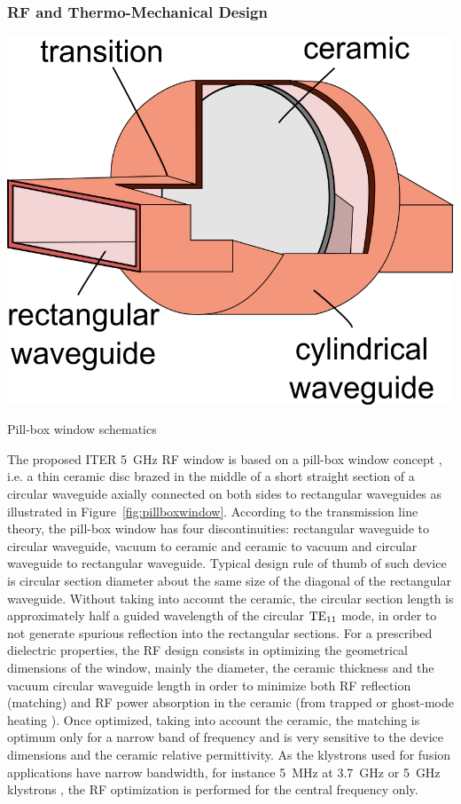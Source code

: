 {%
\subsubsection{RF and Thermo-Mechanical Design}
\begin{marginfigure}
	\centering
	\includegraphics[width=1.0\linewidth]{figures/chap3/pillbox_window}
	\caption{Pill-box window schematics}
	\label{fig:pillboxwindow}
\end{marginfigure}

The proposed ITER 5~\si{GHz} RF window is based on a pill-box window concept , i.e. a thin ceramic disc brazed in the middle of a short straight section of a circular waveguide axially connected on both sides to rectangular waveguides as illustrated in Figure~\ref{fig:pillboxwindow}. According to the transmission line theory, the pill-box window has four discontinuities: rectangular waveguide to circular waveguide, vacuum to ceramic and ceramic to vacuum and circular waveguide to rectangular waveguide. Typical design rule of thumb of such device is circular section diameter about the same size of the diagonal of the rectangular waveguide. Without taking into account the ceramic, the circular section length is approximately half a guided wavelength of the circular ${\mathrm{TE}}_{11}$ mode, in order to not generate spurious reflection into the rectangular sections. For a prescribed dielectric properties, the RF design consists in optimizing the geometrical dimensions of the window, mainly the diameter, the ceramic thickness and the vacuum circular waveguide length in order to minimize both RF reflection (matching) and RF power absorption in the ceramic (from trapped or ghost-mode heating \cite{ives1993} ). Once optimized, taking into account the ceramic, the matching is optimum only for a narrow band of frequency and is very sensitive to the device dimensions and the ceramic relative permittivity. As the klystrons used for fusion applications have narrow bandwidth, for instance 5~MHz at 3.7~GHz  or 5~GHz klystrons , the RF optimization is performed for the central frequency only. 

}
